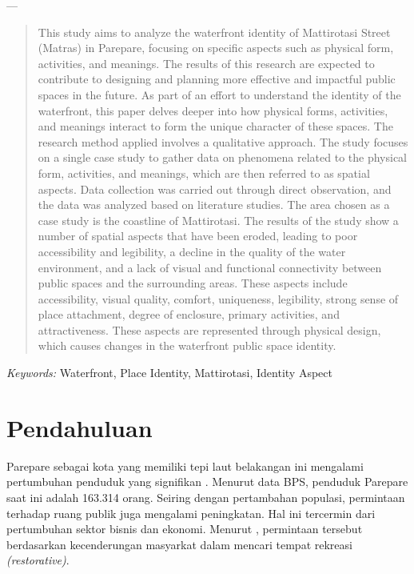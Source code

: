 \documentclass[11pt]{simart} %
\begin{document}
---
\begin{abstract}
	This study aims to analyze the waterfront identity of Mattirotasi Street (Matras) in Parepare, focusing on specific aspects such as physical form, activities, and meanings. The results of this research are expected to contribute to designing and planning more effective and impactful public spaces in the future. As part of an effort to understand the identity of the waterfront, this paper delves deeper into how physical forms, activities, and meanings interact to form the unique character of these spaces. The research method applied involves a qualitative approach. The study focuses on a single case study to gather data on phenomena related to the physical form, activities, and meanings, which are then referred to as spatial aspects. Data collection was carried out through direct observation, and the data was analyzed based on literature studies. The area chosen as a case study is the coastline of Mattirotasi. The results of the study show a number of spatial aspects that have been eroded, leading to poor accessibility and legibility, a decline in the quality of the water environment, and a lack of visual and functional connectivity between public spaces and the surrounding areas. These aspects include accessibility, visual quality, comfort, uniqueness, legibility, strong sense of place attachment, degree of enclosure, primary activities, and attractiveness. These aspects are represented through physical design, which causes changes in the waterfront public space identity.
\end{abstract}

\hspace*{3.6mm}\textit{Keywords:} Waterfront, Place Identity, Mattirotasi, Identity Aspect %

\vspace{30pt} %

% 

\section{Pendahuluan}

Parepare sebagai kota yang memiliki tepi laut belakangan ini mengalami pertumbuhan penduduk yang signifikan \citep{rusman2020}. Menurut data BPS, penduduk Parepare saat ini adalah 163.314 orang.
Seiring dengan pertambahan populasi, permintaan terhadap ruang publik juga mengalami peningkatan. Hal ini tercermin dari  pertumbuhan sektor bisnis dan ekonomi. Menurut \cite{breen1994}, permintaan tersebut berdasarkan kecenderungan masyarkat dalam mencari tempat rekreasi \textit{(restorative)}.
\end{document}

